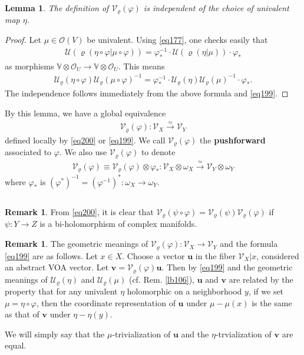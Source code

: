 \documentclass[12pt,a4paper,notitlepage]{article}
\theoremstyle{definition}
\newtheorem{rem}[df]{Remark}
\theoremstyle{plain}
\newtheorem{lm}[df]{Lemma}
\newcommand{\mc}{\mathcal}
\newcommand{\scr}{\mathscr}
\newcommand{\Vbb}{\mathbb V}
\newcommand{\vbf}{\mathbf v}
\newcommand{\ubf}{\mathbf u}
\numberwithin{equation}{section}
\begin{document}
\begin{lm}
The definition of $\mc V_\varrho(\varphi)$ is independent of the choice of univalent map $\eta$.
\end{lm}

\begin{proof}
Let $\mu\in\scr O(V)$ be univalent. Using \eqref{eq177}, one checks easily that
\begin{align*}
\mc U(\varrho(\eta\circ\varphi|\mu\circ\varphi))=\varphi^{-1}_*\cdot\mc U(\varrho(\eta|\mu))\cdot\varphi_*
\end{align*}
as morphisms $\Vbb\otimes\scr O_U\rightarrow\Vbb\otimes\scr O_U$. This means
\begin{align}
\mc U_\varrho(\eta\circ\varphi)\mc U_\varrho(\mu\circ\varphi)^{-1}=\varphi^{-1}_*\cdot\mc U_\varrho(\eta)\mc U_\varrho(\mu)^{-1}\cdot\varphi_*.
\end{align}
The independence follows immediately from the above formula and \eqref{eq199}.
\end{proof}

By this lemma, we have a global equivalence
\begin{align}
\mc V_\varrho(\varphi):\scr V_X\xrightarrow{\simeq}\scr V_Y
\end{align}
defined locally by \eqref{eq200} or \eqref{eq199}. We call $\mc V_\varrho(\varphi)$ the \textbf{pushforward} associated to $\varphi$. We also use $\mc V_\varrho(\varphi)$ to denote
\begin{align}
\mc V_\varrho(\varphi)\equiv \mc V_\varrho(\varphi)\otimes\varphi_*:\scr V_X\otimes\omega_X\xrightarrow{\simeq}\scr V_Y\otimes\omega_Y\label{eq206}
\end{align}
where $\varphi_*$ is  $(\varphi^*)^{-1}=(\varphi^{-1})^*:\omega_X\rightarrow\omega_Y$.

\subsection{}


\begin{rem}
From \eqref{eq200}, it is clear that $\mc V_\varrho(\psi\circ\varphi)=\mc V_\varrho(\psi)\mc V_\varrho(\varphi)$ if $\psi:Y\rightarrow Z$ is a bi-holomorphism of complex manifolds.
\end{rem}

\begin{rem}\label{lb107}
The geometric meanings of $\mc V_\varrho(\varphi):\scr V_X\rightarrow\scr V_Y$ and the formula \eqref{eq199} are as follows. Let $x\in X$. Choose a vector $\ubf$ in the fiber $\scr V_X|x$, considered an abstract VOA vector. Let $\vbf=\mc V_\varrho(\varphi)\ubf$. Then by \eqref{eq199} and the geometric meanings of $\mc U_\varrho(\eta)$ and $\mc U_\varrho(\mu)$ (cf. Rem. \ref{lb106}), $\ubf$ and $\vbf$ are related by the property that for any univalent $\eta$ holomorphic on a neighborhood $y$, if we set $\mu=\eta\circ\varphi$, then  the coordinate representation of $\ubf$ under $\mu-\mu(x)$ is the same as that of $\vbf$ under $\eta-\eta(y)$. 

We will simply say that the $\mu$-trivialization of $\ubf$ and the $\eta$-trvialization of $\vbf$ are equal.
\end{rem}
\end{document}
